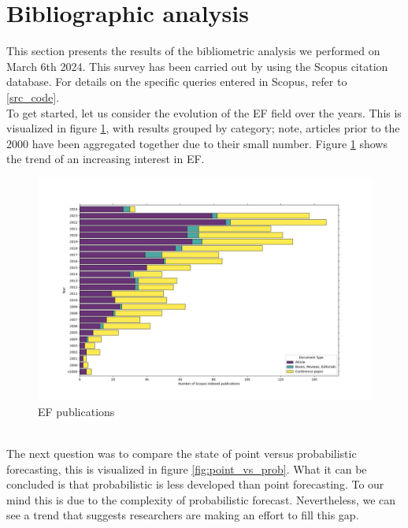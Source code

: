\section{Bibliographic analysis}
This section presents the results of the bibliometric analysis we performed on March 6th 2024. This survey has been carried out by using the Scopus citation database. For details on the specific queries entered in Scopus, refer to \ref{src_code}.
\\
To get started, let us consider the evolution of the EF field over the years. This is visualized in figure \ref{fig:epf_evolution}, with results grouped by category; note, articles prior to the 2000 have been aggregated together due to their small number. Figure \ref{fig:epf_evolution} shows the trend of an increasing interest in EF.
\begin{figure}
    \includegraphics[width=\textwidth]{images/epf_evolution1.jpg}
    \caption{EF publications}
    \label{fig:epf_evolution}
  \end{figure}
\\
The next question was to compare the state of point versus probabilistic forecasting, this is visualized in figure \ref{fig:point_vs_prob}. What it can be concluded is that probabilistic is less developed than point forecasting. To our mind this is due to the complexity of probabilistic forecast.
Nevertheless, we can see a trend that suggests researchers are making an effort to fill this gap.
